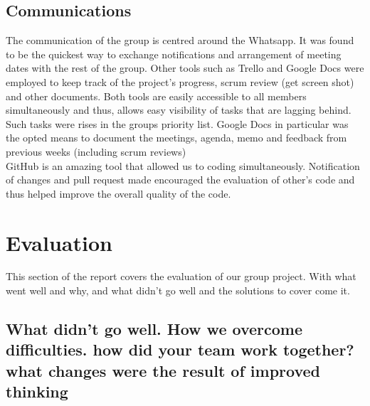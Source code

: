 \documentclass{article}
\begin{document}
		\subsection{Communications}
			The communication of the group is centred around the Whatsapp. It was found to be the quickest way to exchange notifications and arrangement of meeting dates with the rest of the group. Other tools such as Trello and Google Docs were employed to keep track of the project's progress, scrum review (get screen shot) and other documents. Both tools are easily accessible to all members simultaneously and thus, allows easy visibility of tasks that are lagging behind. Such tasks were rises in the groups priority list. Google Docs in particular was the opted means to document the meetings, agenda, memo and feedback from previous weeks (including scrum reviews)\\
			
			GitHub is an amazing tool that allowed us to coding simultaneously. Notification of changes and pull request made encouraged the evaluation of other's code and thus helped improve the overall quality of the code.
	\section{Evaluation}
	This section of the report covers the evaluation of our group project.  With what went well and why, and what didn't go well and the solutions to cover come it.
	
		\subsection{What didn't go well. How we overcome difficulties. how did your team work together? what changes were the result of improved thinking }
			
\end{document}
